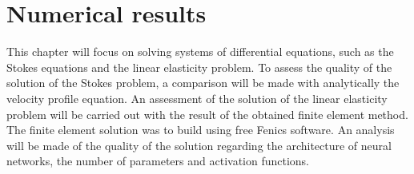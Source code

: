 \chapter{Numerical results}

This chapter will focus on solving systems of differential equations, such as the Stokes equations and the linear elasticity problem. To assess the quality of the solution of the Stokes problem, a comparison will be made with analytically the velocity profile equation. An assessment of the solution of the linear elasticity problem will be carried out with the result of the obtained finite element method. The finite element solution was to build using free Fenics software. An analysis will be made of the quality of the solution regarding the architecture of neural networks, the number of parameters and activation functions.



